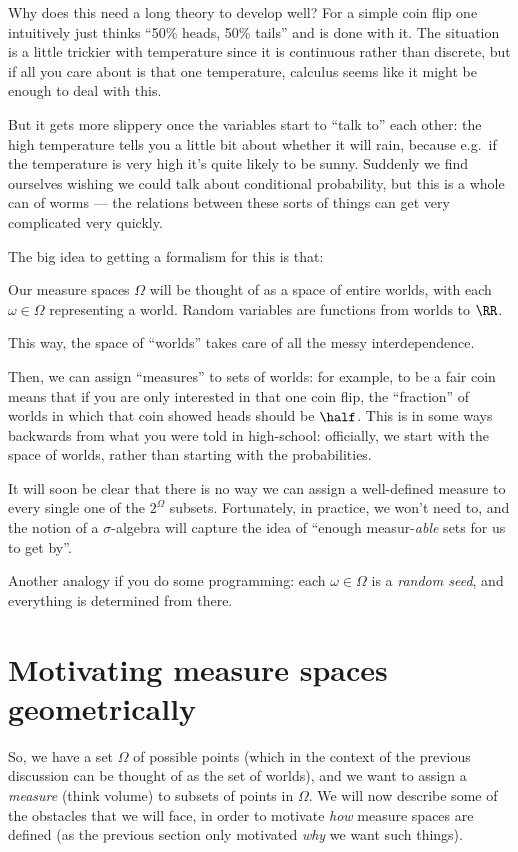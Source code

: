 Why does this need a long theory to develop well?
For a simple coin flip one intuitively just thinks
``50\% heads, 50\% tails'' and is done with it.
The situation is a little trickier with temperature
since it is continuous rather than discrete,
but if all you care about is that one temperature,
calculus seems like it might be enough to deal with this.

But it gets more slippery once the variables start to ``talk to'' each other:
the high temperature tells you a little bit about whether it will rain,
because e.g.\ if the temperature is very high it's quite likely to be sunny.
Suddenly we find ourselves wishing we could talk about conditional probability,
but this is a whole can of worms --- the relations
between these sorts of things can get very complicated very quickly.

The big idea to getting a formalism for this is that:
\begin{moral}
	Our measure spaces $\Omega$ will be thought of as a space of entire worlds,
	with each $\omega \in \Omega$ representing a world.
	Random variables are functions from worlds to $\RR$.
\end{moral}
This way, the space of ``worlds'' takes care of all the messy interdependence.

Then, we can assign ``measures'' to sets of worlds:
for example, to be a fair coin means that if you are only interested in
that one coin flip, the ``fraction'' of worlds in
which that coin showed heads should be $\half$.
This is in some ways backwards from what you were told in high-school:
officially, we start with the space of worlds,
rather than starting with the probabilities.

It will soon be clear that there is no way we can assign
a well-defined measure to every single one of the $2^\Omega$ subsets.
Fortunately, in practice, we won't need to,
and the notion of a $\sigma$-algebra will capture the idea
of ``enough measur-\emph{able} sets for us to get by''.

\begin{remark}
	Another analogy if you do some programming:
	each $\omega \in \Omega$ is a \emph{random seed},
	and everything is determined from there.
\end{remark}

\section{Motivating measure spaces geometrically}
So, we have a set $\Omega$ of possible points
(which in the context of the previous discussion
can be thought of as the set of worlds),
and we want to assign a \emph{measure} (think volume)
to subsets of points in $\Omega$.
We will now describe some of the obstacles that we will face,
in order to motivate \emph{how} measure spaces are defined
(as the previous section only motivated \emph{why} we want such things).

